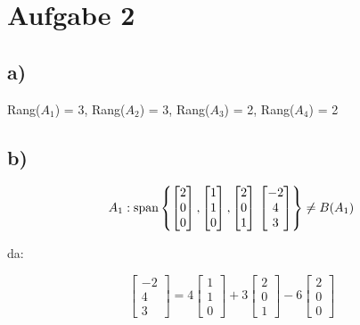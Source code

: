 \documentclass[a4paper, 11pt]{article}
\begin{document}
\section{Aufgabe 2}
\label{sec:org12eb77c}
\subsection{a)}
\label{sec:orge9c695b}
Rang(\(A_1\)) = 3, Rang(\(A_2\)) = 3, Rang(\(A_3\)) = 2, Rang(\(A_4\)) = 2

\subsection{b)}
\label{sec:org0175cf6}

\begin{equation*}
    A_1: \text{span} \left\{ \begin{bmatrix} 2 \\ 0 \\ 0\end{bmatrix}, \begin{bmatrix} 1 \\ 1 \\ 0\end{bmatrix}, \begin{bmatrix} 2 \\ 0 \\ 1\end{bmatrix}\\
    \begin{bmatrix} -2 \\ 4 \\ 3\end{bmatrix} \right\} \neq B(A_1)
\end{equation*}


da:

\begin{equation*}
    \begin{bmatrix} -2 \\ 4 \\ 3\end{bmatrix} = 4\begin{bmatrix} 1 \\ 1 \\ 0\end{bmatrix} +
    3\begin{bmatrix} 2 \\ 0 \\ 1\end{bmatrix} - 6\begin{bmatrix} 2 \\ 0 \\ 0\end{bmatrix}
\end{equation*}
\end{document}

